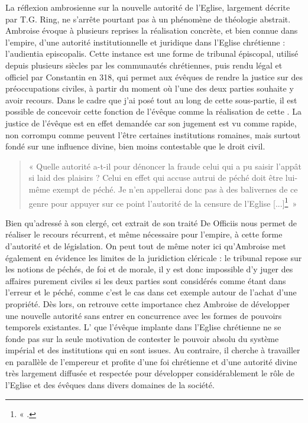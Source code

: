 La réflexion ambrosienne sur la nouvelle autorité de l’Eglise, largement décrite par T.G. Ring, ne s’arrête pourtant pas à un phénomène de théologie abstrait. Ambroise évoque à plusieurs reprises la réalisation concrète, et bien connue dans l’empire, d’une autorité institutionnelle et juridique dans l’Eglise chrétienne : l’audientia episcopalis. Cette instance est une forme de tribunal épiscopal, utilisé depuis plusieurs siècles par les communautés chrétiennes, puis rendu légal et officiel par Constantin en 318, qui permet aux évêques de rendre la justice sur des préoccupations civiles, à partir du moment où l'une des deux parties souhaite y avoir recours. Dans le cadre que j’ai posé tout au long de cette sous-partie, il est possible de concevoir cette fonction de l’évêque comme la réalisation de cette . La justice de l’évêque est en effet demandée car son jugement est vu comme rapide, non corrompu comme peuvent l’être certaines institutions romaines, mais surtout fondé sur une influence divine, bien moins contestable que le droit civil.

\bigskip

\begin{quote}
    « Quelle autorité a-t-il pour dénoncer la fraude celui qui a pu saisir l’appât si laid des plaisirs ? Celui en effet qui accuse autrui de péché doit être lui-même exempt de péché. Je n’en appellerai donc pas à des balivernes de ce genre pour appuyer sur ce point l’autorité de la censure de l’Eglise [...]\footnote{« \cite[\nopp {} III, 72]{ambroise_devoirs_2}.}~»
\end{quote}

\bigskip

Bien qu’adressé à son clergé, cet extrait de son traité De Officiis nous permet de réaliser le recours récurrent, et même nécessaire pour l’empire, à cette forme d’autorité et de législation. On peut tout de même noter ici qu’Ambroise met également en évidence les limites de la juridiction cléricale : le tribunal repose sur les notions de péchés, de foi et de morale, il y est donc impossible d’y juger des affaires purement civiles si les deux parties sont considérés comme étant dans l’erreur et le péché, comme c’est le cas dans cet exemple autour de l’achat d’une propriété. Dès lors, on retrouve cette importance chez Ambroise de développer une nouvelle autorité sans entrer en concurrence avec les formes de pouvoirs temporels existantes. L’ que l’évêque implante dans l’Eglise chrétienne ne se fonde pas sur la seule motivation de contester le pouvoir absolu du système impérial et des institutions qui en sont issues. Au contraire, il cherche à travailler en parallèle de l’empereur et profite d’une foi chrétienne et d’une autorité divine très largement diffusée et respectée pour développer considérablement le rôle de l’Eglise et des évêques dans divers domaines de la société.

